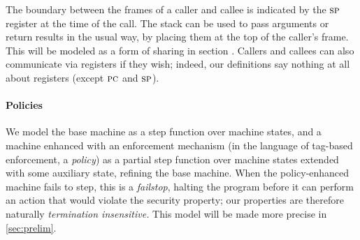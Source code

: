 \documentclass[acmsmall,review,anonymous]{acmart}\settopmatter{printfolios=true,printccs=false,printacmref=false}
\begin{document}
The boundary between the frames of a caller and callee is indicated by the $\textsc{sp}$ register
at the time of the call. The stack can be used to pass arguments or return results
in the usual way, by placing them at the top of the caller's frame. This will be modeled
as a form of sharing in section .
Callers and callees can also communicate via registers if they wish; indeed, our
definitions say nothing at all about registers (except $\textsc{pc}$ and $\textsc{sp}$).

\ifaftersubmission{}\fi

\paragraph*{Policies}

We model the base machine as a step function over machine states, and a machine enhanced with
an enforcement mechanism (in the language of tag-based enforcement, a {\em policy}) as
a partial step function over machine states extended with some auxiliary state, refining
the base machine. When the policy-enhanced machine fails to step, this is a {\em failstop},
halting the program before it can perform an action that would violate the security property; our
properties are therefore naturally \emph{termination insensitive.}
This model will be made more precise in \cref{sec:prelim}.

\end{document}
